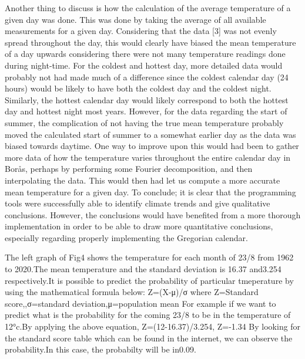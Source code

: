\documentclass[a4, 12pt]{article}
\begin{document}
\indent Another thing to discuss is how the calculation of the average temperature of a given day was done. This was done by taking the average of all available measurements for a given day. Considering that the data [3] was not evenly spread throughout the day, this would clearly have biased the mean temperature of a day upwards considering there were not many temperature readings done during night-time. For the coldest and hottest day, more detailed data would probably not had made much of a difference since the coldest calendar day (24 hours) would be likely to have both the coldest day and the coldest night. Similarly, the hottest calendar day would likely correspond to both the hottest day and hottest night most years. However, for the data regarding the start of summer, the complication of not having the true mean temperature probably moved the calculated start of summer to a somewhat earlier day as the data was biased towards daytime. One way to improve upon this would had been to gather more data of how the temperature varies throughout the entire calendar day in Borås, perhaps by performing some Fourier decomposition, and then interpolating the data. This would then had let us compute a more accurate mean temperature for a given day. \newline
\indent To conclude; it is clear that the programming tools were successfully able to identify climate trends and give qualitative conclusions. However, the conclusions would have benefited from a more thorough implementation in order to be able to draw more quantitative conclusions, especially regarding properly implementing the Gregorian calendar.

 \newline
\indent
The left graph of Fig4 shows the temperature for each month of 23/8 from 1962 to 2020.The mean temperature and the standard deviation is 16.37 and3.254 respectively.It is possible to predict the probability of particular tmeperature by using the mathematical formula below:\newline\indent
Z=(X-μ)/σ where Z=Standard score,,σ=standard deviation,μ=population mean\newline\indent
For example if we want to predict what is the probability for the coming 23/8 to be in the temperature of 12°c.By applying the above equation,\newline\indent
Z=(12-16.37)/3.254,
Z=-1.34 \newline\indent
By looking for the standard score table which can be found in the internet, we can observe the probability.In this case, the probabilty will be in0.09.\newline\indent
\end{document}

